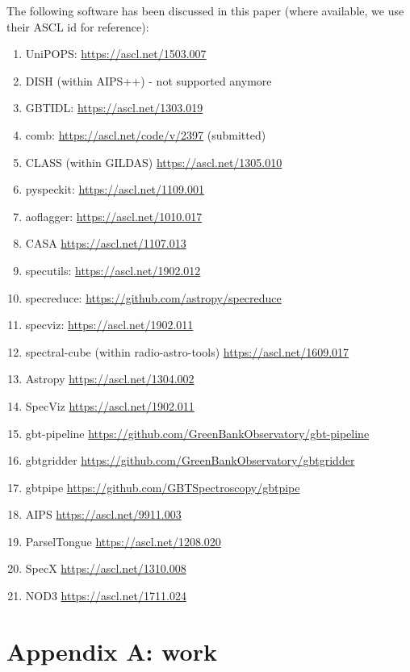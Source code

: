 \documentclass[12pt,a4paper]{article}
\begin{document}
The following software has been discussed in this paper (where available, we use their ASCL id for reference):


\begin{enumerate}
\item UniPOPS: \url{https://ascl.net/1503.007}
\item DISH (within AIPS++) - not supported anymore
\item GBTIDL: \url{https://ascl.net/1303.019}
\item comb: \url{https://ascl.net/code/v/2397}   (submitted)
\item CLASS (within GILDAS) \url{https://ascl.net/1305.010}
\item pyspeckit: \url{https://ascl.net/1109.001}
\item aoflagger: \url{https://ascl.net/1010.017}
\item CASA \url{https://ascl.net/1107.013}
\item specutils: \url{https://ascl.net/1902.012}
\item specreduce:  \url{https://github.com/astropy/specreduce}
\item specviz: \url{https://ascl.net/1902.011}
\item spectral-cube (within radio-astro-tools) \url{https://ascl.net/1609.017}
\item Astropy \url{https://ascl.net/1304.002}
\item SpecViz \url{https://ascl.net/1902.011}
\item gbt-pipeline \url{https://github.com/GreenBankObservatory/gbt-pipeline}
\item gbtgridder \url{https://github.com/GreenBankObservatory/gbtgridder}
\item gbtpipe \url{https://github.com/GBTSpectroscopy/gbtpipe}
\item AIPS \url{https://ascl.net/9911.003}
\item ParselTongue \url{https://ascl.net/1208.020}
\item SpecX \url{https://ascl.net/1310.008}
\item NOD3 \url{https://ascl.net/1711.024}

\end{enumerate}




\newpage
\section*{Appendix A: work}
\end{document}
